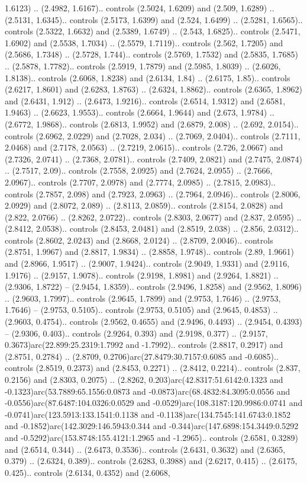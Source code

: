 1.6123) .. (2.4982, 1.6167).. controls (2.5024, 1.6209) and (2.509, 1.6289) .. (2.5131, 1.6345).. controls (2.5173, 1.6399) and (2.524, 1.6499) .. (2.5281, 1.6565).. controls (2.5322, 1.6632) and (2.5389, 1.6749) .. (2.543, 1.6825).. controls (2.5471, 1.6902) and (2.5538, 1.7034) .. (2.5579, 1.7119).. controls (2.562, 1.7205) and (2.5686, 1.7348) .. (2.5728, 1.744).. controls (2.5769, 1.7532) and (2.5835, 1.7685) .. (2.5878, 1.7782).. controls (2.5919, 1.7879) and (2.5985, 1.8039) .. (2.6026, 1.8138).. controls (2.6068, 1.8238) and (2.6134, 1.84) .. (2.6175, 1.85).. controls (2.6217, 1.8601) and (2.6283, 1.8763) .. (2.6324, 1.8862).. controls (2.6365, 1.8962) and (2.6431, 1.912) .. (2.6473, 1.9216).. controls (2.6514, 1.9312) and (2.6581, 1.9463) .. (2.6623, 1.9553).. controls (2.6664, 1.9644) and (2.673, 1.9784) .. (2.6772, 1.9868).. controls (2.6813, 1.9952) and (2.6879, 2.008) .. (2.692, 2.0154).. controls (2.6962, 2.0229) and (2.7028, 2.034) .. (2.7069, 2.0404).. controls (2.7111, 2.0468) and (2.7178, 2.0563) .. (2.7219, 2.0615).. controls (2.726, 2.0667) and (2.7326, 2.0741) .. (2.7368, 2.0781).. controls (2.7409, 2.0821) and (2.7475, 2.0874) .. (2.7517, 2.09).. controls (2.7558, 2.0925) and (2.7624, 2.0955) .. (2.7666, 2.0967).. controls (2.7707, 2.0978) and (2.7774, 2.0985) .. (2.7815, 2.0983).. controls (2.7857, 2.098) and (2.7923, 2.0963) .. (2.7964, 2.0946).. controls (2.8006, 2.0929) and (2.8072, 2.089) .. (2.8113, 2.0859).. controls (2.8154, 2.0828) and (2.822, 2.0766) .. (2.8262, 2.0722).. controls (2.8303, 2.0677) and (2.837, 2.0595) .. (2.8412, 2.0538).. controls (2.8453, 2.0481) and (2.8519, 2.038) .. (2.856, 2.0312).. controls (2.8602, 2.0243) and (2.8668, 2.0124) .. (2.8709, 2.0046).. controls (2.8751, 1.9967) and (2.8817, 1.9834) .. (2.8858, 1.9748).. controls (2.89, 1.9661) and (2.8966, 1.9517) .. (2.9007, 1.9424).. controls (2.9049, 1.9331) and (2.9116, 1.9176) .. (2.9157, 1.9078).. controls (2.9198, 1.8981) and (2.9264, 1.8821) .. (2.9306, 1.8722) -- (2.9454, 1.8359).. controls (2.9496, 1.8258) and (2.9562, 1.8096) .. (2.9603, 1.7997).. controls (2.9645, 1.7899) and (2.9753, 1.7646) .. (2.9753, 1.7646) -- (2.9753, 0.5105).. controls (2.9753, 0.5105) and (2.9645, 0.4853) .. (2.9603, 0.4754).. controls (2.9562, 0.4655) and (2.9496, 0.4493) .. (2.9454, 0.4393) -- (2.9306, 0.403).. controls (2.9264, 0.393) and (2.9198, 0.377) .. (2.9157, 0.3673)arc(22.899:25.2319:1.7992 and -1.7992).. controls (2.8817, 0.2917) and (2.8751, 0.2784) .. (2.8709, 0.2706)arc(27.8479:30.7157:0.6085 and -0.6085).. controls (2.8519, 0.2373) and (2.8453, 0.2271) .. (2.8412, 0.2214).. controls (2.837, 0.2156) and (2.8303, 0.2075) .. (2.8262, 0.203)arc(42.8317:51.6142:0.1323 and -0.1323)arc(53.7889:65.1556:0.0873 and -0.0873)arc(68.4832:84.3095:0.0556 and -0.0556)arc(87.6487:104.0326:0.0529 and -0.0529)arc(108.3187:120.9986:0.0741 and -0.0741)arc(123.5913:133.1541:0.1138 and -0.1138)arc(134.7545:141.6743:0.1852 and -0.1852)arc(142.3029:146.5943:0.344 and -0.344)arc(147.6898:154.3449:0.5292 and -0.5292)arc(153.8748:155.4121:1.2965 and -1.2965).. controls (2.6581, 0.3289) and (2.6514, 0.344) .. (2.6473, 0.3536).. controls (2.6431, 0.3632) and (2.6365, 0.379) .. (2.6324, 0.389).. controls (2.6283, 0.3988) and (2.6217, 0.415) .. (2.6175, 0.425).. controls (2.6134, 0.4352) and (2.6068, 